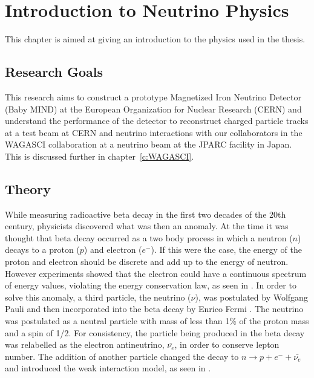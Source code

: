 \chapter{Introduction to Neutrino Physics}
\label{c:theoryIntro}

This chapter is aimed at giving an introduction to the physics used in the thesis.

\section{Research Goals}
This research aims to construct a prototype Magnetized Iron Neutrino Detector (Baby MIND) at the European Organization for Nuclear Research (CERN) and understand the performance of the detector to reconstruct charged particle tracks at a test beam at CERN and neutrino interactions with our collaborators in the WAGASCI collaboration at a neutrino beam at the JPARC facility in Japan. This is discussed further in chapter~\ref{c:WAGASCI}.

\section{Theory}\label{section:Theory}
While measuring radioactive beta decay in the first two decades of the 20th century, physicists discovered what was then an anomaly. At the time it was thought that beta decay occurred as a two body process in which a neutron ($n$) decays to a proton ($p$) and electron ($e^-$). If this were the case, the energy of the proton and electron should be discrete and add up to the energy of neutron. However experiments showed that the electron could have a continuous spectrum of energy values, violating the energy conservation law, as seen in . In order to solve this anomaly, a third particle, the neutrino ($\nu$), was postulated by Wolfgang Pauli \cite{4Pauli:Online} and then incorporated into the beta decay by Enrico Fermi \cite{5Wilson}. The neutrino was postulated as a neutral particle with mass of less than 1\% of the proton mass and a spin of 1/2. For consistency, the particle being produced in the beta decay was relabelled as the electron antineutrino, $\bar{\nu_e}$, in order to conserve lepton number. The addition of another particle changed the decay to $n \rightarrow p + e^- + \bar{\nu_e}$ and introduced the weak interaction model, as seen in . 

